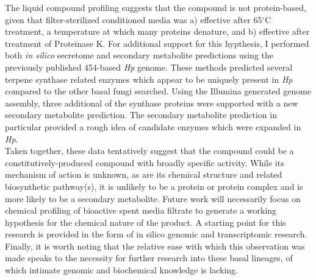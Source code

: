 \indent The liquid compound profiling suggests that the compound is not protein-based, given that filter-sterilized conditioned media was a) effective after 65$^{\circ}$C treatment, a temperature at which many proteins denature, and b) effective after treatment of Proteinase K. For additional support for this hypthesis, I performed both \textit{in silico} secretome and secondary metabolite predictions using the previously published 454-based \textit{Hp} genome. These methods predicted several terpene synthase related enzymes which appear to be uniquely present in \textit{Hp} compared to the other basal fungi searched. Using the Illumina generated genome assembly, three additional of the synthase proteins were supported with a new secondary metabolite prediction. The secondary metabolite prediction in particular provided a rough idea of candidate enzymes which were expanded in \textit{Hp}.\\
\indent Taken together, these data tentatively suggest that the compound could be a constitutively-produced compound with broadly specific activity. While its mechanism of action is unknown, as are its chemical structure and related biosynthetic pathway(s), it is unlikely to be a protein or protein complex and is more likely to be a secondary metabolite. Future work will necessarily focus on chemical profiling of bioactive spent media filtrate to generate a working hypothesis for the chemical nature of the product. A starting point for this research is provided in the form of in silico genomic and transcriptomic research. Finally, it is worth noting that the relative ease with which this observation was made speaks to the necessity for further research into these basal lineages, of which intimate genomic and biochemical knowledge is lacking.\\
